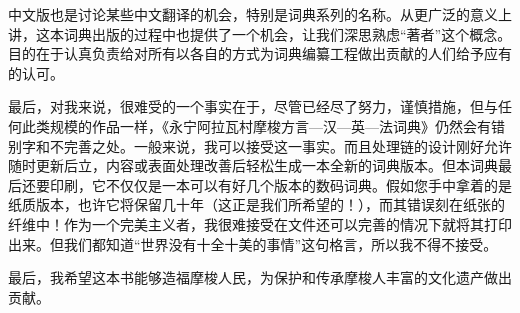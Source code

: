 中文版也是讨论某些中文翻译的机会，特别是词典系列的名称。从更广泛的意义上讲，这本词典出版的过程中也提供了一个机会，让我们深思熟虑“著者”这个概念。目的在于认真负责给对所有以各自的方式为词典编纂工程做出贡献的人们给予应有的认可。

最后，对我来说，很难受的一个事实在于，尽管已经尽了努力，谨慎措施，但与任何此类规模的作品一样，《永宁阿拉瓦村摩梭方言—汉—英—法词典》仍然会有错别字和不完善之处。一般来说，我可以接受这一事实。而且处理链的设计刚好允许随时更新后立，内容或表面处理改善后轻松生成一本全新的词典版本。但本词典最后还要印刷，它不仅仅是一本可以有好几个版本的数码词典。假如您手中拿着的是纸质版本，也许它将保留几十年（这正是我们所希望的！），而其错误刻在纸张的纤维中！作为一个完美主义者，我很难接受在文件还可以完善的情况下就将其打印出来。但我们都知道“世界没有十全十美的事情”这句格言，所以我不得不接受。

最后，我希望这本书能够造福摩梭人民，为保护和传承摩梭人丰富的文化遗产做出贡献。

\bigskip

\hfill \benjaminfra

